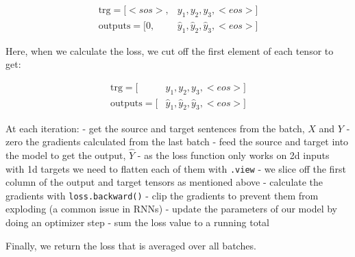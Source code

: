\documentclass[11pt]{article}
\begin{document}
\[\begin{align*}
\text{trg} = [<sos>, &y_1, y_2, y_3, <eos>]\\
\text{outputs} = [0, &\hat{y}_1, \hat{y}_2, \hat{y}_3, <eos>]
\end{align*}\]

Here, when we calculate the loss, we cut off the first element of each
tensor to get:

\[\begin{align*}
\text{trg} = [&y_1, y_2, y_3, <eos>]\\
\text{outputs} = [&\hat{y}_1, \hat{y}_2, \hat{y}_3, <eos>]
\end{align*}\]

At each iteration: - get the source and target sentences from the batch,
\(X\) and \(Y\) - zero the gradients calculated from the last batch -
feed the source and target into the model to get the output, \(\hat{Y}\)
- as the loss function only works on 2d inputs with 1d targets we need
to flatten each of them with \texttt{.view} - we slice off the first
column of the output and target tensors as mentioned above - calculate
the gradients with \texttt{loss.backward()} - clip the gradients to
prevent them from exploding (a common issue in RNNs) - update the
parameters of our model by doing an optimizer step - sum the loss value
to a running total

Finally, we return the loss that is averaged over all batches.
\end{document}

